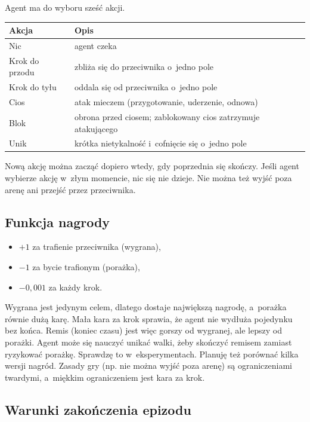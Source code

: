 \documentclass[12pt]{article}
\begin{document}
Agent ma do wyboru sześć akcji.

\begin{center}
\begin{tabular}{p{}p{}}
\toprule
Akcja & Opis \\
\midrule
Nic & agent czeka \\
Krok do przodu & zbliża się do przeciwnika o~jedno pole \\
Krok do tyłu & oddala się od przeciwnika o~jedno pole \\
Cios & atak mieczem (przygotowanie, uderzenie, odnowa) \\
Blok & obrona przed ciosem; zablokowany cios zatrzymuje atakującego \\
Unik & krótka nietykalność i~cofnięcie się o~jedno pole \\
\bottomrule
\end{tabular}
\end{center}

Nową akcję można zacząć dopiero wtedy, gdy poprzednia się skończy. Jeśli agent wybierze akcję w~złym momencie, nic się nie dzieje. Nie można też wyjść poza arenę ani przejść przez przeciwnika.

\subsection{Funkcja nagrody}

\begin{itemize}
    \item $+1$ za trafienie przeciwnika (wygrana),
    \item $-1$ za bycie trafionym (porażka),
    \item $-0{,}001$ za każdy krok.
\end{itemize}

Wygrana jest jedynym celem, dlatego dostaje największą nagrodę, a~porażka równie dużą karę. Mała kara za krok sprawia, że agent nie wydłuża pojedynku bez końca. Remis (koniec czasu) jest więc gorszy od wygranej, ale lepszy od porażki. Agent może się nauczyć unikać walki, żeby skończyć remisem zamiast ryzykować porażkę. Sprawdzę to w~eksperymentach. Planuję też porównać kilka wersji nagród. Zasady gry (np. nie można wyjść poza arenę) są ograniczeniami twardymi, a~miękkim ograniczeniem jest kara za krok.

\subsection{Warunki zakończenia epizodu}
\end{document}
